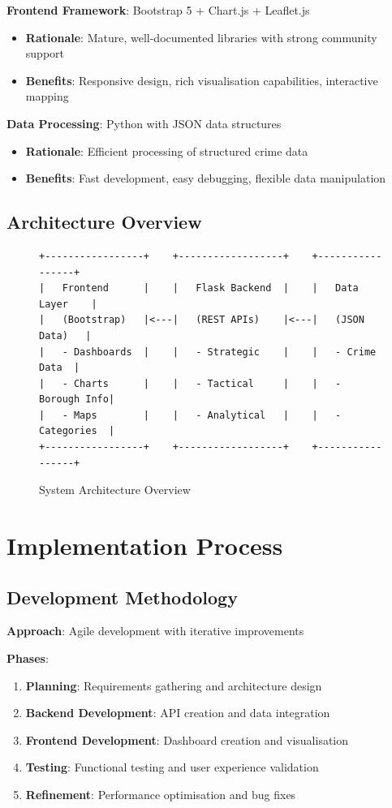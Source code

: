 \documentclass[12pt,a4paper]{article}
\begin{document}
\textbf{Frontend Framework}: Bootstrap 5 + Chart.js + Leaflet.js
\begin{itemize}
    \item \textbf{Rationale}: Mature, well-documented libraries with strong community support
    \item \textbf{Benefits}: Responsive design, rich visualisation capabilities, interactive mapping
\end{itemize}

\textbf{Data Processing}: Python with JSON data structures
\begin{itemize}
    \item \textbf{Rationale}: Efficient processing of structured crime data
    \item \textbf{Benefits}: Fast development, easy debugging, flexible data manipulation
\end{itemize}

\subsection{Architecture Overview}

\begin{figure}[h]
\centering
\begin{verbatim}
+-----------------+    +------------------+    +-----------------+
|   Frontend      |    |   Flask Backend  |    |   Data Layer    |
|   (Bootstrap)   |<---|   (REST APIs)    |<---|   (JSON Data)   |
|   - Dashboards  |    |   - Strategic    |    |   - Crime Data  |
|   - Charts      |    |   - Tactical     |    |   - Borough Info|
|   - Maps        |    |   - Analytical   |    |   - Categories  |
+-----------------+    +------------------+    +-----------------+
\end{verbatim}
\caption{System Architecture Overview}
\end{figure}

\section{Implementation Process}

\subsection{Development Methodology}

\textbf{Approach}: Agile development with iterative improvements

\textbf{Phases}:
\begin{enumerate}
    \item \textbf{Planning}: Requirements gathering and architecture design
    \item \textbf{Backend Development}: API creation and data integration
    \item \textbf{Frontend Development}: Dashboard creation and visualisation
    \item \textbf{Testing}: Functional testing and user experience validation
    \item \textbf{Refinement}: Performance optimisation and bug fixes
\end{enumerate}
\end{document}
